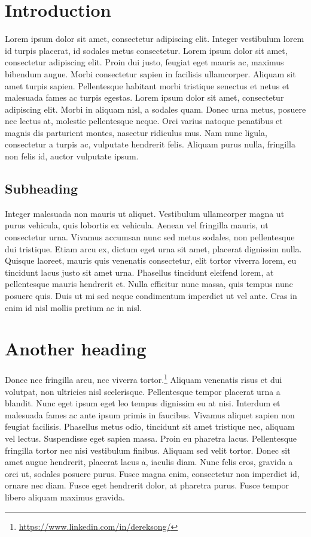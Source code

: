 \documentclass[letter]{ourGreenwayBrand}
\begin{document}
\MakeBrandTitle

\section{Introduction}
Lorem ipsum dolor sit amet, consectetur adipiscing elit. Integer vestibulum lorem id turpis placerat, id sodales metus consectetur. Lorem ipsum dolor sit amet, consectetur adipiscing elit. Proin dui justo, feugiat eget mauris ac, maximus bibendum augue. Morbi consectetur sapien in facilisis ullamcorper. Aliquam sit amet turpis sapien. Pellentesque habitant morbi tristique senectus et netus et malesuada fames ac turpis egestas. Lorem ipsum dolor sit amet, consectetur adipiscing elit. Morbi in aliquam nisl, a sodales quam. Donec urna metus, posuere nec lectus at, molestie pellentesque neque. Orci varius natoque penatibus et magnis dis parturient montes, nascetur ridiculus mus. Nam nunc ligula, consectetur a turpis ac, vulputate hendrerit felis. Aliquam purus nulla, fringilla non felis id, auctor vulputate ipsum.

\subsection{Subheading}
Integer malesuada non mauris ut aliquet. Vestibulum ullamcorper magna ut purus vehicula, quis lobortis ex vehicula. Aenean vel fringilla mauris, ut consectetur urna. Vivamus accumsan nunc sed metus sodales, non pellentesque dui tristique. Etiam arcu ex, dictum eget urna sit amet, placerat dignissim nulla. Quisque laoreet, mauris quis venenatis consectetur, elit tortor viverra lorem, eu tincidunt lacus justo sit amet urna. Phasellus tincidunt eleifend lorem, at pellentesque mauris hendrerit et. Nulla efficitur nunc massa, quis tempus nunc posuere quis. Duis ut mi sed neque condimentum imperdiet ut vel ante. Cras in enim id nisl mollis pretium ac in nisl.

\section{Another heading}
Donec nec fringilla arcu, nec viverra tortor.\footnote{\url{https://www.linkedin.com/in/dereksong/}} Aliquam venenatis risus et dui volutpat, non ultricies nisl scelerisque. Pellentesque tempor placerat urna a blandit. Nunc eget ipsum eget leo tempus dignissim eu at nisi. Interdum et malesuada fames ac ante ipsum primis in faucibus. Vivamus aliquet sapien non feugiat facilisis. Phasellus metus odio, tincidunt sit amet tristique nec, aliquam vel lectus. Suspendisse eget sapien massa. Proin eu pharetra lacus. Pellentesque fringilla tortor nec nisi vestibulum finibus. Aliquam sed velit tortor. Donec sit amet augue hendrerit, placerat lacus a, iaculis diam. Nunc felis eros, gravida a orci ut, sodales posuere purus. Fusce magna enim, consectetur non imperdiet id, ornare nec diam. Fusce eget hendrerit dolor, at pharetra purus. Fusce tempor libero aliquam maximus gravida.
\end{document}
